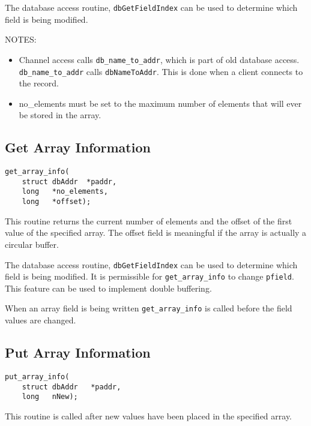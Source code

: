 The database access routine, \verb|dbGetFieldIndex| can be used to determine which field is being modified.

NOTES:

\begin{itemize}
\item Channel access calls \verb|db_name_to_addr|, which is part of old database access.
\verb|db_name_to_addr| calls \verb|dbNameToAddr|.
This is done when a client connects to the record.

\item no\_elements must be set to the maximum number of elements that will ever be stored in the array.

\end{itemize}

\subsection{Get Array Information}

\begin{verbatim}
get_array_info(
    struct dbAddr  *paddr,
    long   *no_elements,
    long   *offset);
\end{verbatim}

This routine returns the current number of elements and the offset of the first value of the specified array.
The offset field is meaningful if the array is actually a circular buffer.

The database access routine, \verb|dbGetFieldIndex| can be used to determine which field is being modified.
It is permissible for \verb|get_array_info| to change \verb|pfield|.
This feature can be used to implement double buffering.

When an array field is being written \verb|get_array_info| is called before the field values are changed.

\subsection{Put Array Information}

\begin{verbatim}
put_array_info(
    struct dbAddr   *paddr,
    long   nNew);
\end{verbatim}

This routine is called after new values have been placed in the specified array.

